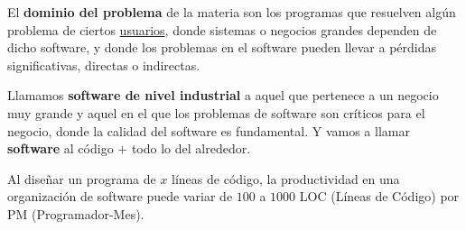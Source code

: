 
El \textbf{dominio del problema} de la materia son los programas que resuelven algún problema de ciertos \underline{usuarios}, donde sistemas o negocios grandes dependen de dicho software, y donde los problemas en el software pueden llevar a pérdidas significativas, directas o indirectas.

\begin{mydef}{}{}
    Llamamos \textbf{software de nivel industrial} a aquel que pertenece a un negocio muy grande y aquel en el que los problemas de software son críticos para el negocio, donde la calidad del software es fundamental. Y vamos a llamar \textbf{software} al código $+$ todo lo del alrededor.
\end{mydef}

Al diseñar un programa de $x$ líneas de código, la productividad en una organización de software puede variar de $100$ a $1000$ LOC (Líneas de Código) por PM (Programador-Mes).